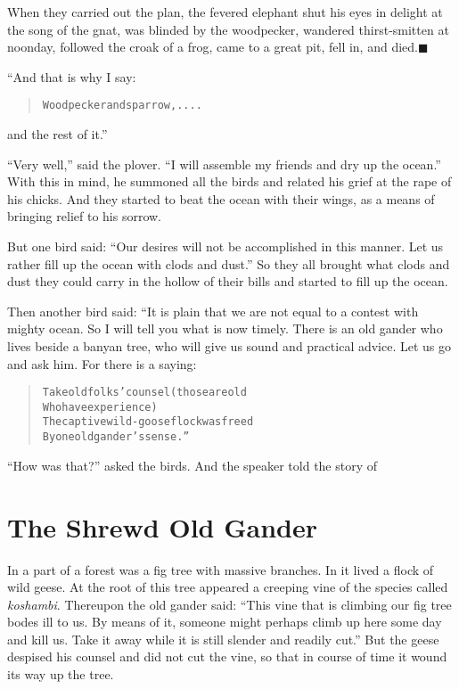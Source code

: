 \documentclass[article, twoside, 14pt]{memoir}
\newcommand{\qed}{\hfill \ensuremath{\blacksquare}}
\renewenvironment{verbatim}{%
\begin{quote}%
\vskip -10pt%
\begin{alltt}\normalfont\large}{\end{alltt}%
\end{quote}%
\vskip -10pt
} %
\begin{document}
When they carried out the plan, the fevered elephant shut his eyes
in delight at the song of the gnat, was blinded by the woodpecker,
wandered thirst-smitten at noonday, followed the croak of a frog,
came to a great pit, fell in, and died.\hyperref[s21]{\qed}

“And that is why I say:

\begin{verbatim}
Woodpecker and sparrow, . . . .
\end{verbatim}
and the rest of it.”

``Very well,'' said the plover.
``I will assemble my friends and dry up the ocean.'' With this in
mind, he summoned all the birds and related his grief at the rape
of his chicks. And they started to beat the ocean with their wings,
as a means of bringing relief to his sorrow.

But one bird said:
``Our desires will not be accomplished in this manner. Let us rather fill up the ocean with clods and dust.''
So they all brought what clods and dust they could carry in the
hollow of their bills and started to fill up the ocean.

Then another bird said: “It is plain that we are not equal to a
contest with mighty ocean. So I will tell you what is now timely.
There is an old gander who lives beside a banyan tree, who will
give us sound and practical advice. Let us go and ask him. For
there is a saying:

\begin{verbatim}
Take old folks' counsel (those are old
    Who have experience)
The captive wild-goose flock was freed
    By one old gander's sense.”
\end{verbatim}
``How was that?'' asked the birds. And the speaker told the story
of

\chapter{The Shrewd Old Gander}

\label{s22}

In a part of a forest was a fig tree with massive branches. In it
lived a flock of wild geese. At the root of this tree appeared a
creeping vine of the species called \emph{koshambi}. Thereupon the
old gander said:
``This vine that is climbing our fig tree bodes ill to us. By means of it, someone might perhaps climb up here some day and kill us. Take it away while it is still slender and readily cut.''
But the geese despised his counsel and did not cut the vine, so
that in course of time it wound its way up the tree.
\end{document}
